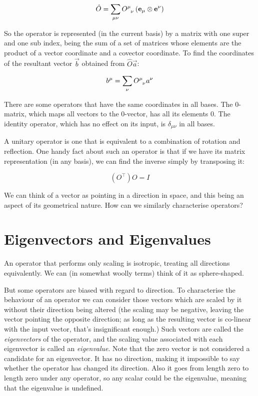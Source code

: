 \begin{equation}
\hat{O} = \sum_{\mu\nu} O\indices{^\mu_\nu} \left( \vec{e}_\mu \otimes \vec{e}^\nu \right)
\end{equation}

So the operator is represented (in the current basis) by a matrix with one super and one sub index, being the sum of a set of matrices whose elements are the product of a vector coordinate and a covector coordinate. To find the coordinates of the resultant vector $\vec{b}$ obtained from $\hat{O} \vec{a}$:

$$
b^\mu = \sum_{\nu} O\indices{^\mu_\nu} a^\nu
$$

There are some operators that have the same coordinates in all bases. The $0$-matrix, which maps all vectors to the $0$-vector, has all its elements $0$. The identity operator, which has no effect on its input, is $\delta_{\mu\nu}$ in all bases.

A unitary operator is one that is equivalent to a combination of rotation and reflection. One handy fact about such an operator is that if we have its matrix representation (in any basis), we can find the inverse simply by transposing it:

$$
(O^\intercal) O = I
$$

We can think of a vector as pointing in a direction in space, and this being an aspect of its geometrical nature. How can we similarly characterise operators?

\section{Eigenvectors and Eigenvalues}\label{sec:vectors-eigen}

An operator that performs only scaling is isotropic, treating all directions equivalently. We can (in somewhat woolly terms) think of it as sphere-shaped.

But some operators are biased with regard to direction. To characterise the behaviour of an operator we can consider those vectors which are scaled by it without their direction being altered (the scaling may be negative, leaving the vector pointing the opposite direction; as long as the resulting vector is co-linear with the input vector, that's insignificant enough.) Such vectors are called the \textit{eigenvectors} of the operator, and the scaling value associated with each eigenvector is called an \textit{eigenvalue}. Note that the zero vector is not considered a candidate for an eigenvector. It has no direction, making it impossible to say whether the operator has changed its direction. Also it goes from length zero to length zero under any operator, so any scalar could be the eigenvalue, meaning that the eigenvalue is undefined.

